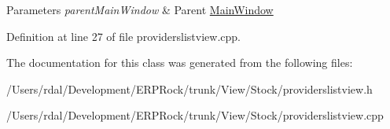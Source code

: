 \begin{DoxyParams}{\-Parameters}
{\em parent\-Main\-Window} & \-Parent \hyperlink{class_main_window}{\-Main\-Window} \\
\hline
\end{DoxyParams}


\-Definition at line 27 of file providerslistview.\-cpp.



\-The documentation for this class was generated from the following files\-:\begin{DoxyCompactItemize}
\item 
/\-Users/rdal/\-Development/\-E\-R\-P\-Rock/trunk/\-View/\-Stock/providerslistview.\-h\item 
/\-Users/rdal/\-Development/\-E\-R\-P\-Rock/trunk/\-View/\-Stock/providerslistview.\-cpp\end{DoxyCompactItemize}
